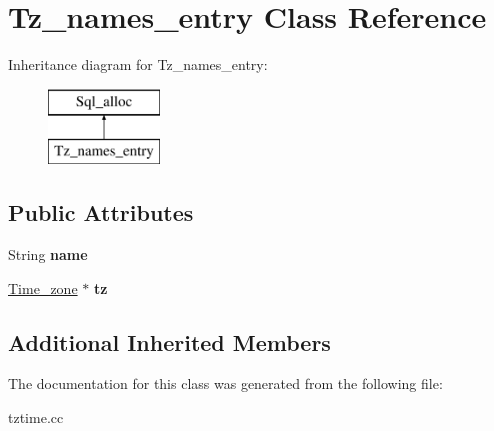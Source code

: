 \hypertarget{classTz__names__entry}{}\section{Tz\+\_\+names\+\_\+entry Class Reference}
\label{classTz__names__entry}
Inheritance diagram for Tz\+\_\+names\+\_\+entry\+:\begin{figure}[H]
\begin{center}
\leavevmode
\includegraphics[height=2.000000cm]{classTz__names__entry}
\end{center}
\end{figure}
\subsection*{Public Attributes}
\begin{DoxyCompactItemize}
\item 
\mbox{\label{classTz__names__entry_ace0f77cf6b2c1ee0a5414e603ed2245c}} 
String {\bfseries name}
\item 
\mbox{\label{classTz__names__entry_a7ddba447e6b988f3b2b1773a7abb132b}} 
\mbox{\hyperlink{classTime__zone}{Time\+\_\+zone}} $\ast$ {\bfseries tz}
\end{DoxyCompactItemize}
\subsection*{Additional Inherited Members}


The documentation for this class was generated from the following file\+:\begin{DoxyCompactItemize}
\item 
tztime.\+cc\end{DoxyCompactItemize}
